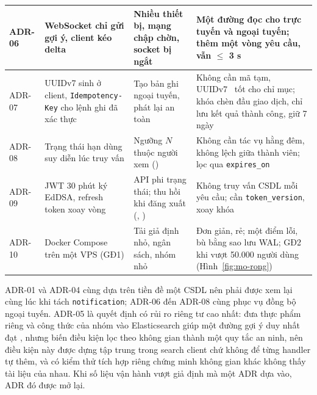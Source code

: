 {\begin{longtable}{|C{1.5cm}|L{3.2cm}|L{\dimexpr(\arrayrulewidth-1.5cm-3.2cm)/2\relax}|L{\dimexpr(\arrayrulewidth-1.5cm-3.2cm)/2\relax}|}
\mbox{ADR-06} & WebSocket chỉ gửi gợi ý, client kéo delta & Nhiều thiết bị, mạng chập chờn, socket bị ngắt & Một đường đọc cho trực tuyến và ngoại tuyến; thêm một vòng yêu cầu, vẫn $\le$ 3 s\\ \hline
\mbox{ADR-07} & UUIDv7 sinh ở client, \texttt{Idempotency-\allowbreak Key} cho lệnh ghi đã xác thực & Tạo bản ghi ngoại tuyến, phát lại an toàn~\cite{idempotencykey} & Không cần mã tạm, UUIDv7~\cite{rfc9562} tốt cho chỉ mục; khóa chèn đầu giao dịch, chỉ lưu kết quả thành công, giữ 7 ngày\\ \hline
\mbox{ADR-08} & Trạng thái hạn dùng suy diễn lúc truy vấn & Ngưỡng $N$ thuộc người xem () & Không cần tác vụ hằng đêm, không lệch giữa thành viên; lọc qua \texttt{expires\_on}\\ \hline
\mbox{ADR-09} & JWT 30 phút ký EdDSA, refresh token xoay vòng & API phi trạng thái; thu hồi khi đăng xuất (, ) & Không truy vấn CSDL mỗi yêu cầu; cần \texttt{token\_version}, xoay khóa\\ \hline
\mbox{ADR-10} & Docker Compose trên một VPS (GĐ1) & Tải giả định nhỏ, ngân sách, nhóm nhỏ & Đơn giản, rẻ; một điểm lỗi, bù bằng sao lưu WAL; GĐ2 khi vượt 50.000 người dùng (Hình~\ref{fig:mo-rong})\\ \hline
\end{longtable}
}

ADR-01 và ADR-04 cùng dựa trên tiền đề một CSDL nên phải được xem lại cùng lúc khi tách \texttt{notification}; ADR-06 đến ADR-08 cùng phục vụ đồng bộ ngoại tuyến. ADR-05 là quyết định có rủi ro riêng tư cao nhất: đưa thực phẩm riêng và công thức của nhóm vào Elasticsearch giúp một đường gợi ý duy nhất đạt , nhưng biến điều kiện lọc theo không gian thành một quy tắc an ninh, nên điều kiện này được dựng tập trung trong search client chứ không để từng handler tự thêm, và có kiểm thử tích hợp riêng chứng minh không gian khác không thấy tài liệu của nhau. Khi số liệu vận hành vượt giả định mà một ADR dựa vào, ADR đó được mở lại.
